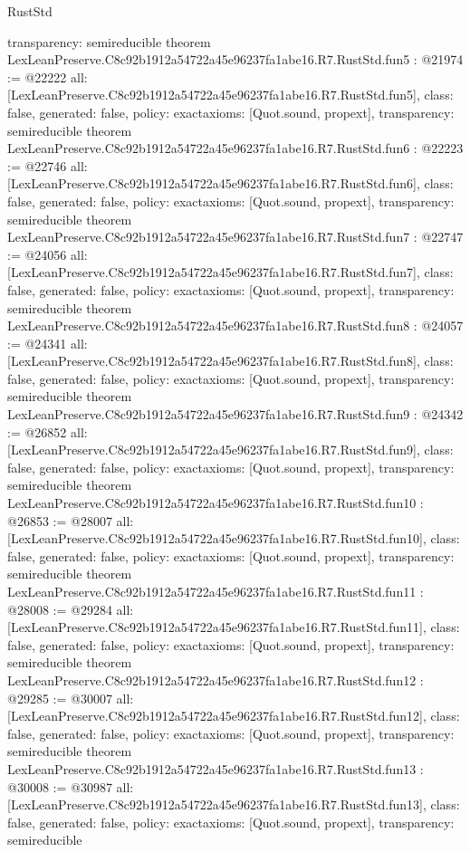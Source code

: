 \begin{lexlean}{RustStd}
\begin{coremodule}
{  transparency: semireducible
}
theorem LexLeanPreserve.C8c92b1912a54722a45e96237fa1abe16.R7.RustStd.fun5 : @21974 := @22222 {
  all: [LexLeanPreserve.C8c92b1912a54722a45e96237fa1abe16.R7.RustStd.fun5],
  class: false,
  generated: false,
  policy: exact{axioms: [Quot.sound, propext]},
  transparency: semireducible
}
theorem LexLeanPreserve.C8c92b1912a54722a45e96237fa1abe16.R7.RustStd.fun6 : @22223 := @22746 {
  all: [LexLeanPreserve.C8c92b1912a54722a45e96237fa1abe16.R7.RustStd.fun6],
  class: false,
  generated: false,
  policy: exact{axioms: [Quot.sound, propext]},
  transparency: semireducible
}
theorem LexLeanPreserve.C8c92b1912a54722a45e96237fa1abe16.R7.RustStd.fun7 : @22747 := @24056 {
  all: [LexLeanPreserve.C8c92b1912a54722a45e96237fa1abe16.R7.RustStd.fun7],
  class: false,
  generated: false,
  policy: exact{axioms: [Quot.sound, propext]},
  transparency: semireducible
}
theorem LexLeanPreserve.C8c92b1912a54722a45e96237fa1abe16.R7.RustStd.fun8 : @24057 := @24341 {
  all: [LexLeanPreserve.C8c92b1912a54722a45e96237fa1abe16.R7.RustStd.fun8],
  class: false,
  generated: false,
  policy: exact{axioms: [Quot.sound, propext]},
  transparency: semireducible
}
theorem LexLeanPreserve.C8c92b1912a54722a45e96237fa1abe16.R7.RustStd.fun9 : @24342 := @26852 {
  all: [LexLeanPreserve.C8c92b1912a54722a45e96237fa1abe16.R7.RustStd.fun9],
  class: false,
  generated: false,
  policy: exact{axioms: [Quot.sound, propext]},
  transparency: semireducible
}
theorem LexLeanPreserve.C8c92b1912a54722a45e96237fa1abe16.R7.RustStd.fun10 : @26853 := @28007 {
  all: [LexLeanPreserve.C8c92b1912a54722a45e96237fa1abe16.R7.RustStd.fun10],
  class: false,
  generated: false,
  policy: exact{axioms: [Quot.sound, propext]},
  transparency: semireducible
}
theorem LexLeanPreserve.C8c92b1912a54722a45e96237fa1abe16.R7.RustStd.fun11 : @28008 := @29284 {
  all: [LexLeanPreserve.C8c92b1912a54722a45e96237fa1abe16.R7.RustStd.fun11],
  class: false,
  generated: false,
  policy: exact{axioms: [Quot.sound, propext]},
  transparency: semireducible
}
theorem LexLeanPreserve.C8c92b1912a54722a45e96237fa1abe16.R7.RustStd.fun12 : @29285 := @30007 {
  all: [LexLeanPreserve.C8c92b1912a54722a45e96237fa1abe16.R7.RustStd.fun12],
  class: false,
  generated: false,
  policy: exact{axioms: [Quot.sound, propext]},
  transparency: semireducible
}
theorem LexLeanPreserve.C8c92b1912a54722a45e96237fa1abe16.R7.RustStd.fun13 : @30008 := @30987 {
  all: [LexLeanPreserve.C8c92b1912a54722a45e96237fa1abe16.R7.RustStd.fun13],
  class: false,
  generated: false,
  policy: exact{axioms: [Quot.sound, propext]},
  transparency: semireducible
}
\end{coremodule}
\end{lexlean}
